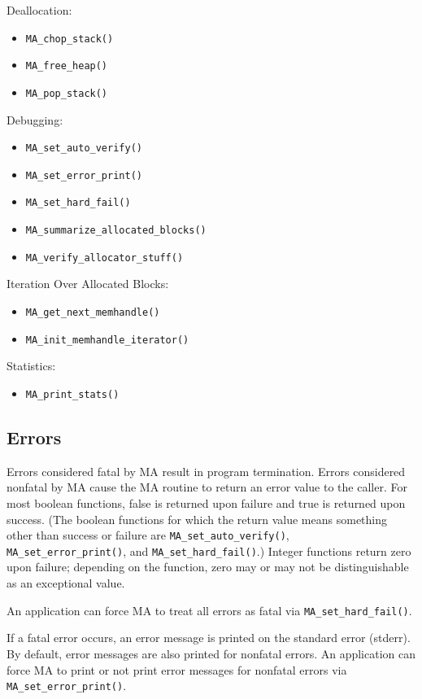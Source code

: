 Deallocation:
\begin{itemize}
\item {\tt MA\_chop\_stack()}
\item {\tt MA\_free\_heap()}
\item {\tt MA\_pop\_stack()}
\end{itemize}

Debugging:
\begin{itemize}
\item {\tt MA\_set\_auto\_verify()}
\item {\tt MA\_set\_error\_print()}
\item {\tt MA\_set\_hard\_fail()}
\item {\tt MA\_summarize\_allocated\_blocks()}
\item {\tt MA\_verify\_allocator\_stuff()}
\end{itemize}

Iteration Over Allocated Blocks:
\begin{itemize}
\item {\tt MA\_get\_next\_memhandle()}
\item {\tt MA\_init\_memhandle\_iterator()}
\end{itemize}

Statistics:
\begin{itemize}
\item {\tt MA\_print\_stats()}
\end{itemize}


\subsection{Errors}

Errors considered fatal by MA result in program termination.  Errors
considered nonfatal by MA cause the MA routine to return an error
value to the caller.  For most boolean functions, false is returned
upon failure and true is returned upon success.  (The boolean
functions for which the return value means something other than
success or failure are {\tt MA\_set\_auto\_verify()}, {\tt
  MA\_set\_error\_print()}, and {\tt MA\_set\_hard\_fail()}.)  Integer
functions return zero upon failure; depending on the function, zero
may or may not be distinguishable as an exceptional value.

An application can force MA to treat all errors as fatal via
{\tt MA\_set\_hard\_fail()}.

If a fatal error occurs, an error message is printed on the standard
error (stderr).  By default, error messages are also printed for
nonfatal errors.  An application can force MA to print or not print
error messages for nonfatal errors via {\tt MA\_set\_error\_print()}.

